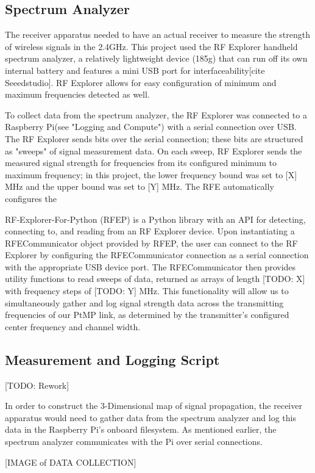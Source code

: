 \documentclass[pageno]{jpaper}
\begin{document}
\subsection{Spectrum Analyzer}
The receiver apparatus needed to have an actual receiver to measure the strength of wireless signals in the 2.4GHz. This project used the RF Explorer handheld spectrum analyzer, a relatively lightweight device (185g) that can run off its own internal battery and features a mini USB port for interfaceability[cite Seeedstudio]. RF Explorer allows for easy configuration of minimum and maximum frequencies detected as well.

To collect data from the spectrum analyzer, the RF Explorer was connected to a Raspberry Pi(see "Logging and Compute") with a serial connection over USB. The RF Explorer sends bits over the serial connection; these bits are structured as "sweeps" of signal measurement data.  On each sweep, RF Explorer sends the measured signal strength for frequencies from its configured minimum to maximum frequency; in this project, the lower frequency bound was set to [X] MHz and the upper bound was set to [Y] MHz. The RFE automatically configures the 

RF-Explorer-For-Python (RFEP) is a Python library with an API for detecting, connecting to, and reading from an RF Explorer device. Upon instantiating a RFECommunicator object provided by RFEP, the user can connect to the RF Explorer by configuring the RFECommunicator connection as a serial connection with the appropriate USB device port. The RFECommunicator then provides utility functions to read sweeps of data, returned as arrays of length [TODO: X] with frequency steps of [TODO: Y] MHz. This functionality will allow us to simultaneously gather and log signal strength data across the transmitting frequencies of our PtMP link, as determined by the transmitter's configured center frequency and channel width.

\subsection{Measurement and Logging Script}
[TODO: Rework]

In order to construct the 3-Dimensional map of signal propagation, the receiver apparatus would need to gather data from the spectrum analyzer and log this data in the Raspberry Pi's onboard filesystem. As mentioned earlier, the spectrum analyzer communicates with the Pi over serial connections.

[IMAGE of DATA COLLECTION]
\end{document}
